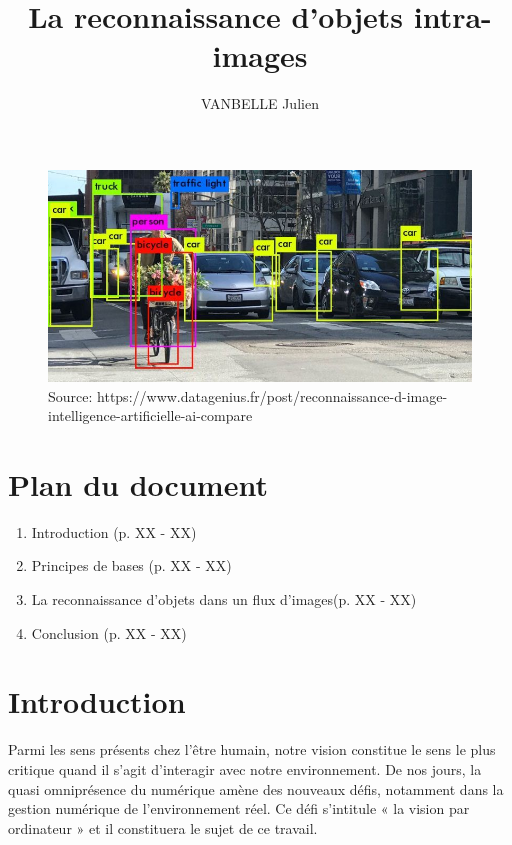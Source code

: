 \documentclass[a4paper,12pt]{article} %
\title{\textbf{La reconnaissance d'objets intra-images}} %
\author{VANBELLE Julien} %
\date{} %
\begin{document}
\maketitle %

\begin{figure}[h] %
  \centering %
  \includegraphics[scale=0.5]{illu1.jpg} %
  \caption{Source: https://www.datagenius.fr/post/reconnaissance-d-image-intelligence-artificielle-ai-compare} %
\end{figure}
\vspace{40}
\section{Plan du document}
\begin{enumerate}
    \item Introduction (p. XX - XX) \newline
    \item Principes de bases (p. XX - XX)\newline
    \item La reconnaissance d'objets dans un flux d'images(p. XX - XX)\newline
    \item Conclusion (p. XX - XX)\newline
\end{enumerate}
               \newpage
\section{Introduction} %
		Parmi les sens présents chez l'être humain, notre vision constitue le sens le plus critique quand il s'agit d'interagir avec notre environnement. De nos jours, la quasi omniprésence du numérique amène des nouveaux défis, notamment dans la gestion numérique de l’environnement réel. Ce défi s’intitule « la vision par ordinateur » et il constituera le sujet de ce travail. \newline
\end{document}

